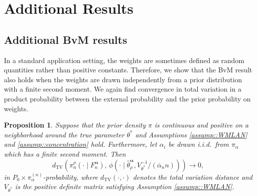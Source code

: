 \documentclass[11pt, oneside]{amsart}
\newtheorem{proposition}{Proposition}
\theoremstyle{definition}   %
\newcommand{\loss}{\rho}
\newcommand{\mposterior}{\pi_n^{\loss}}
\newcommand{\wempirical}{F_n^{\boldsymbol{\alpha}}}
\newcommand{\mestimator}{\hat{\theta}^{\boldsymbol{\alpha}}_{\loss }}
\begin{document}
\section{Additional Results} \label{appendix::additional-results}

\subsection{Additional BvM results} \label{asec::additional-BvM-results}

%
In a standard application setting, the weights are sometimes defined as random quantities rather than positive constants. Therefore, we show that the BvM result also holds when the weights are drawn independently from a prior distribution with a finite second moment. We again find convergence in total variation in a product probability between the external probability and the prior probability on weights.
%
\begin{proposition}
\label{prop::BvMrandom}
    Suppose that the prior density $\pi$ is continuous and positive on a neighborhood around the true parameter $\theta^*$ and Assumptions \ref{assump::WMLAN} and \ref{assump::concentration} hold.
    Furthermore, let $\alpha_i$ be drawn i.i.d.\ from $\pi_\alpha$ which has a finite second moment. Then
    $$d_{\mathrm{TV}} \left( \mposterior(\cdot \mid \wempirical), \, \phi(\cdot \mid \mestimator, V_{\theta^*}^{-1} / (\overline{\alpha}_n n)) \right) \to 0,$$
    in $P_0 \times \pi_\alpha^{(n)}$-probability, where $d_{\mathrm{TV}}(\cdot, \cdot)$ denotes the total variation distance and $V_{\theta^*}$ is the positive definite matrix satisfying Assumption \ref{assump::WMLAN}.
\end{proposition}
%
\end{document}
